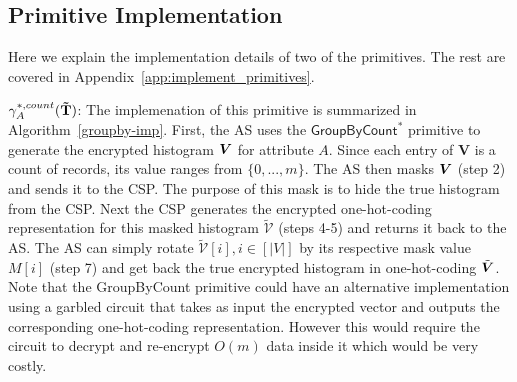  

\subsection{Primitive Implementation}
Here we explain the implementation details of two of the  \system primitives. The rest are covered in Appendix~\ref{app:implement_primitives}.

 $\gamma^{*,count}_A(\mathbf{\tilde{T}})$: The implemenation of this primitive is summarized in Algorithm~\ref{groupby-imp}. First, the \textsf{AS} uses the $\textsf{GroupByCount}^*$ primitive to generate the encrypted histogram $\boldsymbol{V}$ for attribute $A$. Since each entry of $\mathbf{V}$ is a count of records, its value ranges from $\{0,...,m\}$. The \textsf{AS} then masks $\boldsymbol{V}$ (step 2) and sends it to the \textsf{CSP}. The purpose of this mask is to hide the true histogram from the \textsf{CSP}. Next the \textsf{CSP} generates the encrypted one-hot-coding representation for this masked histogram $\boldsymbol{\tilde{\mathcal{V}}}$ (steps 4-5) and returns it back to the \textsf{AS}. %
The \textsf{AS} can simply rotate $\boldsymbol{\tilde{\mathcal{V}}}[i], i \in [|V|]$ by its respective mask value $M[i]$ (step 7) and get back the true encrypted histogram in one-hot-coding $\tilde{\boldsymbol{V}}$.
Note that the \textsf{GroupByCount} primitive could have an alternative implementation using a garbled circuit that takes as input the encrypted vector and outputs the corresponding one-hot-coding representation. However this would require the circuit to decrypt and re-encrypt $O(m)$ data inside it which would be very costly. 
 


